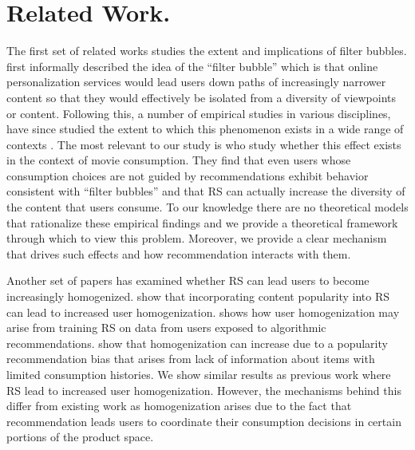 \documentclass[sigconf]{acmart}
\begin{document}
\section{Related Work.} 
The first set of related works studies the extent and implications of filter bubbles. \cite{pariser2011filter} first informally described the idea of the ``filter bubble'' which is that online personalization services would lead users down paths of increasingly narrower content so that they would effectively be isolated from a diversity of viewpoints or content. Following this, a number of empirical studies in various disciplines, have since studied the extent to which this phenomenon exists in a wide range of contexts \cite{flaxman2016filter,hosanagar2013will,moller2018blame,nguyen2014exploring}. The most relevant to our study is \cite{nguyen2014exploring} who study whether this effect exists in the context of movie consumption. They find that even users whose consumption choices are not guided by recommendations exhibit behavior consistent with ``filter bubbles'' and that RS can actually increase the diversity of the content that users consume. To our knowledge there are no theoretical models that rationalize these empirical findings and we provide a theoretical framework through which to view this problem. Moreover, we provide a clear mechanism that drives such effects and how recommendation interacts with them.

 
Another set of papers has examined whether RS can lead users to become increasingly homogenized. \cite{celma2008hits, treviranus2009value} show that incorporating content popularity into RS can lead to increased user homogenization. \cite{chaney2018algorithmic} shows how user homogenization may arise from training RS on data from users exposed to algorithmic recommendations. \cite{fleder2009blockbuster} show that homogenization can increase due to a popularity recommendation bias that arises from lack of information about items with limited consumption histories. We show similar results as previous work where RS lead to increased user homogenization. However, the mechanisms behind this differ from existing work as homogenization arises due to the fact that recommendation leads users to coordinate their consumption decisions in certain portions of the product space.
\end{document}
